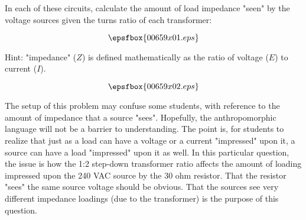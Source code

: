 

In each of these circuits, calculate the amount of load impedance "seen" by the voltage sources given the turns ratio of each transformer:

$$\epsfbox{00659x01.eps}$$

Hint: "impedance" ($Z$) is defined mathematically as the ratio of voltage ($E$) to current ($I$).







$$\epsfbox{00659x02.eps}$$







The setup of this problem may confuse some students, with reference to the amount of impedance that a source "sees".  Hopefully, the anthropomorphic language will not be a barrier to understanding.  The point is, for students to realize that just as a load can have a voltage or a current "impressed" upon it, a source can have a load "impressed" upon it as well.  In this particular question, the issue is how the 1:2 step-down transformer ratio affects the amount of loading impressed upon the 240 VAC source by the 30 ohm resistor.  That the resistor "sees" the same source voltage should be obvious.  That the sources see very different impedance loadings (due to the transformer) is the purpose of this question.




